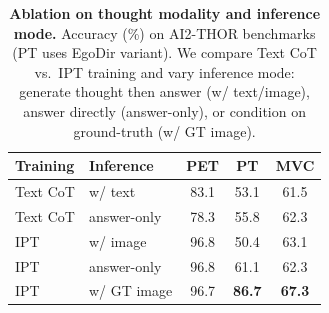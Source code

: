 \begin{table}[t]
  \caption{\textbf{Ablation on thought modality and inference mode.} Accuracy (\%) on AI2-THOR benchmarks (PT uses EgoDir variant). We compare Text CoT vs.\ IPT training and vary inference mode: generate thought then answer (w/ text/image), answer directly (answer-only), or condition on ground-truth (w/ GT image).}
  \vspace{-1em}
  \centering
  \setlength{\tabcolsep}{6pt}
  \small
  \begin{tabular}{ll ccc}
    \toprule
    \textbf{Training} & \textbf{Inference} & \textbf{PET} & \textbf{PT} & \textbf{MVC} \\
    \midrule
    Text CoT   & w/ text      & 83.1 & 53.1 & 61.5 \\
    Text CoT   & answer-only  & 78.3 & 55.8 & 62.3 \\
    \midrule
    IPT        & w/ image     & 96.8 & 50.4 & 63.1 \\
    IPT        & answer-only  & 96.8 & 61.1 & 62.3 \\
    \midrule
    IPT        & w/ GT image  & 96.7 & \textbf{86.7} & \textbf{67.3} \\
    \bottomrule
  \end{tabular}
  \label{tab:ablation_thought}
\end{table}